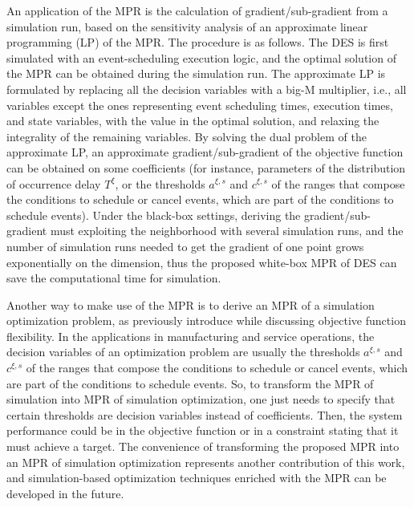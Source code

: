 \documentclass[suppldata]{interact}
\theoremstyle{plain}
\theoremstyle{definition}
\theoremstyle{remark}
\begin{document}
An application of the MPR is the calculation of gradient/sub-gradient from a simulation run, based on the sensitivity analysis of an approximate linear programming (LP) of the MPR. The procedure is as follows. The DES is first simulated with an event-scheduling execution logic, and the optimal solution of the MPR can be obtained during the simulation run. The approximate LP is formulated by replacing all the decision variables with a big-M multiplier, i.e., all variables except the ones representing event scheduling times, execution times, and state variables, with the value in the optimal solution, and relaxing the integrality of the remaining variables. By solving the dual problem of the approximate LP, an approximate gradient/sub-gradient of the objective function can be obtained on some coefficients (for instance, parameters of the distribution of occurrence delay $T^{\xi}$, or the thresholds $a^{\xi,s}$ and $c^{\xi,s}$ of the ranges that compose the conditions to schedule or cancel events, which are part of the conditions to schedule events). Under the black-box settings, deriving the gradient/sub-gradient must exploiting the neighborhood with several simulation runs, and the number of simulation runs needed to get the gradient of one point grows exponentially on the dimension, thus the proposed white-box MPR of DES can save the computational time for simulation.

Another way to make use of the MPR is to derive an MPR of a simulation optimization problem, as previously introduce while discussing objective function flexibility. In the applications in manufacturing and service operations, the decision variables of an optimization problem are usually the thresholds $a^{\xi,s}$ and $c^{\xi,s}$ of the ranges that compose the conditions to schedule or cancel events, which are part of the conditions to schedule events. So, to transform the MPR of simulation into MPR of simulation optimization, one just needs to specify that certain thresholds are decision variables instead of coefficients. Then, the system performance could be in the objective function or in a constraint stating that it must achieve a target. The convenience of transforming the proposed MPR into an MPR of simulation optimization represents another contribution of this work, and simulation-based optimization techniques enriched with the MPR can be developed in the future.

\end{document}
